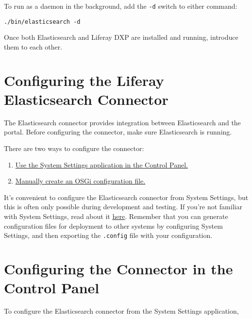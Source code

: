 To run as a daemon in the background, add the \texttt{-d} switch to
either command:

\begin{verbatim}
./bin/elasticsearch -d
\end{verbatim}

Once both Elasticsearch and Liferay DXP are installed and running,
introduce them to each other.

\section{Configuring the Liferay Elasticsearch
Connector}\label{configuring-the-liferay-elasticsearch-connector-1}

The Elasticsearch connector provides integration between Elasticsearch
and the portal. Before configuring the connector, make sure
Elasticsearch is running.

There are two ways to configure the connector:

\begin{enumerate}
\def\labelenumi{\arabic{enumi}.}
\item
  \hyperref[configuring-the-connector-in-the-control-panel]{Use the
  System Settings application in the Control Panel.}
\item
  \hyperref[configuring-the-connector-with-an-osgi-config-file]{Manually
  create an OSGi configuration file.}
\end{enumerate}

It's convenient to configure the Elasticsearch connector from System
Settings, but this is often only possible during development and
testing. If you're not familiar with System Settings, read about it
\href{/docs/7-2/user/-/knowledge_base/u/system-settings}{here}. Remember
that you can generate configuration files for deployment to other
systems by configuring System Settings, and then exporting the
\texttt{.config} file with your configuration.

\section{Configuring the Connector in the Control
Panel}\label{configuring-the-connector-in-the-control-panel}

To configure the Elasticsearch connector from the System Settings
application,


